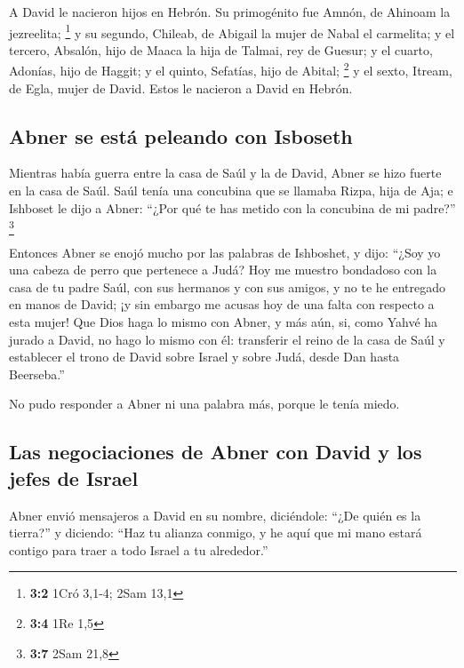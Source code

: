 \begin{paracol}{2}
 A David le nacieron hijos en Hebrón. Su primogénito fue
Amnón, de Ahinoam la jezreelita; \footnote{\textbf{3:2} 1Cró 3,1-4; 2Sam
  13,1}  y su segundo, Chileab, de Abigail la mujer de
Nabal el carmelita; y el tercero, Absalón, hijo de Maaca la hija de
Talmai, rey de Guesur;  y el cuarto, Adonías, hijo de
Haggit; y el quinto, Sefatías, hijo de Abital; \footnote{\textbf{3:4}
  1Re 1,5}  y el sexto, Itream, de Egla, mujer de David.
Estos le nacieron a David en Hebrón.

\hypertarget{abner-se-estuxe1-peleando-con-isboseth}{%
\subsection{Abner se está peleando con
Isboseth}\label{abner-se-estuxe1-peleando-con-isboseth}}

 Mientras había guerra entre la casa de Saúl y la de
David, Abner se hizo fuerte en la casa de Saúl.  Saúl
tenía una concubina que se llamaba Rizpa, hija de Aja; e Ishboset le
dijo a Abner: ``¿Por qué te has metido con la concubina de mi padre?''
\footnote{\textbf{3:7} 2Sam 21,8}

 Entonces Abner se enojó mucho por las palabras de
Ishboshet, y dijo: ``¿Soy yo una cabeza de perro que pertenece a Judá?
Hoy me muestro bondadoso con la casa de tu padre Saúl, con sus hermanos
y con sus amigos, y no te he entregado en manos de David; ¡y sin embargo
me acusas hoy de una falta con respecto a esta mujer!  Que
Dios haga lo mismo con Abner, y más aún, si, como Yahvé ha jurado a
David, no hago lo mismo con él:  transferir el reino de
la casa de Saúl y establecer el trono de David sobre Israel y sobre
Judá, desde Dan hasta Beerseba.''

 No pudo responder a Abner ni una palabra más, porque le
tenía miedo.

\hypertarget{las-negociaciones-de-abner-con-david-y-los-jefes-de-israel}{%
\subsection{Las negociaciones de Abner con David y los jefes de
Israel}\label{las-negociaciones-de-abner-con-david-y-los-jefes-de-israel}}

 Abner envió mensajeros a David en su nombre, diciéndole:
``¿De quién es la tierra?'' y diciendo: ``Haz tu alianza conmigo, y he
aquí que mi mano estará contigo para traer a todo Israel a tu
alrededor.''


\end{paracol}

